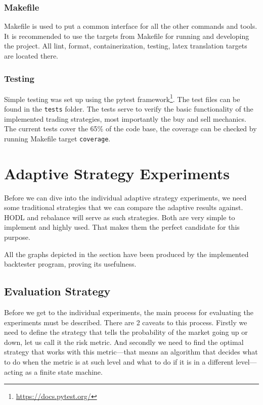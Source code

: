 \subsection*{Makefile}
Makefile is used to put a common interface for all the other commands and tools. It is recommended to use the targets from Makefile for running and developing the project. All lint, format, containerization, testing, latex translation targets are located there.

\subsection*{Testing}
Simple testing was set up using the pytest framework\footnote{\url{https://docs.pytest.org/}}. The test files can be found in the \texttt{tests} folder. The tests serve to verify the basic functionality of the implemented trading strategies, most importantly the buy and sell mechanics. The current tests cover the 65\% of the code base, the coverage can be checked by running Makefile target \texttt{coverage}.

\chapter{Adaptive Strategy Experiments}
\label{chapter-experiments}

Before we can dive into the individual adaptive strategy experiments, we need some traditional strategies that we can compare the adaptive results against. HODL and rebalance will serve as such strategies. Both are very simple to implement and highly used. That makes them the perfect candidate for this purpose.

All the graphs depicted in the section have been produced by the implemented backtester program, proving its usefulness.

\section{Evaluation Strategy}
Before we get to the individual experiments, the main process for evaluating the experiments must be described. There are 2 caveats to this process. Firstly we need to define the strategy that tells the probability of the market going up or down, let us call it the risk metric. And secondly we need to find the optimal strategy that works with this metric---that means an algorithm that decides what to do when the metric is at such level and what to do if it is in a different level---acting as a finite state machine.

